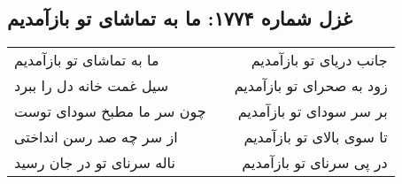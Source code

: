 \begin{center}
\section*{غزل شماره ۱۷۷۴: ما به تماشای تو بازآمدیم}
\label{sec:1774}
\begin{longtable}{l p{0.5cm} r}
ما به تماشای تو بازآمدیم
&&
جانب دریای تو بازآمدیم
\\
سیل غمت خانه دل را ببرد
&&
زود به صحرای تو بازآمدیم
\\
چون سر ما مطبخ سودای توست
&&
بر سر سودای تو بازآمدیم
\\
از سر چه صد رسن انداختی
&&
تا سوی بالای تو بازآمدیم
\\
ناله سرنای تو در جان رسید
&&
در پی سرنای تو بازآمدیم
\\
\end{longtable}
\end{center}
